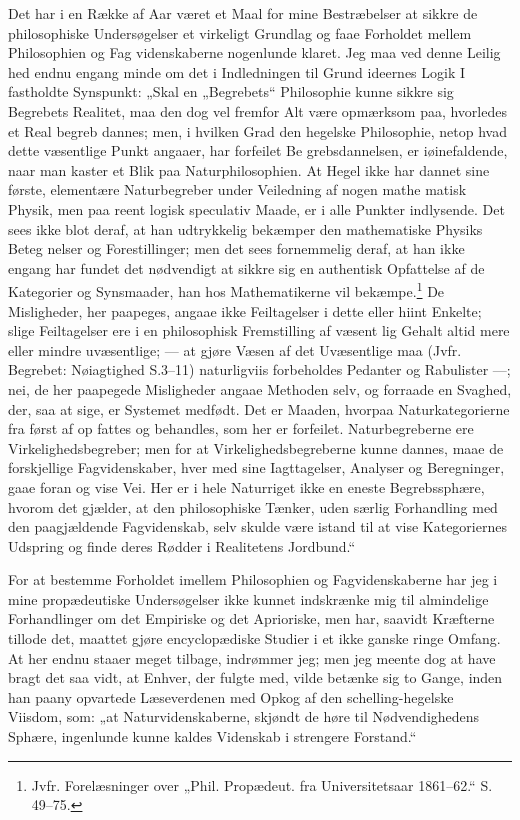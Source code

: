 \documentclass[12pt]{book}
\newcommand{\opage}[1]{\marginnote{\footnotesize\textit{[#1]}}}
\begin{document}
Det har i en Række af Aar været et Maal for mine
Bestræbelser at sikkre de philosophiske Undersøgelser et virkeligt
Grundlag og faae Forholdet mellem Philosophien og Fag\-%
videnskaberne nogenlunde klaret. Jeg maa ved denne Leilig\-%
hed endnu engang minde om det i Indledningen til Grund\-%
ideernes Logik I fastholdte Synspunkt: „Skal en „Begrebets“
Philosophie kunne sikkre sig Begrebets Realitet, maa den dog
vel fremfor Alt være opmærksom paa, hvorledes et Real\-%
begreb dannes; men, i hvilken Grad den hegelske Philosophie,
netop hvad dette væsentlige Punkt angaaer, har forfeilet Be\-%
grebsdannelsen, er iøinefaldende, naar man kaster et Blik
paa Naturphilosophien. At Hegel ikke har dannet sine første,
elementære Naturbegreber under Veiledning af nogen mathe\-%
matisk Physik, men paa reent logisk speculativ Maade, er
i alle Punkter indlysende. Det sees ikke blot deraf, at
han udtrykkelig bekæmper den mathematiske Physiks Beteg\-%
nelser og Forestillinger; men det sees fornemmelig deraf, at
han ikke engang har fundet det nødvendigt at sikkre sig en
authentisk Opfattelse af de Kategorier og Synsmaader, han
hos Mathematikerne vil bekæmpe.\footnote{Jvfr. Forelæsninger over „Phil. Propædeut. fra Universitetsaar
1861--62.“ S. 49--75.}
De Misligheder, her
paapeges, angaae ikke Feiltagelser i dette eller hiint Enkelte;
\opage{112}\setcounter{footnote}{0}%
slige Feiltagelser ere i en philosophisk Fremstilling af væsent\-%
lig Gehalt altid mere eller mindre uvæsentlige; --- at gjøre
Væsen af det Uvæsentlige maa (Jvfr. Begrebet: Nøiagtighed
S.3--11) naturligviis forbeholdes Pedanter og Rabulister ---;
nei, de her paapegede Misligheder angaae Methoden selv, og
forraade en Svaghed, der, saa at sige, er Systemet medfødt.
Det er Maaden, hvorpaa Naturkategorierne fra først af op\-%
fattes og behandles, som her er forfeilet. Naturbegreberne
ere Virkelighedsbegreber; men for at Virkelighedsbegreberne
kunne dannes, maae de forskjellige Fagvidenskaber, hver med sine
Iagttagelser, Analyser og Beregninger, gaae foran og vise
Vei. Her er i hele Naturriget ikke en eneste Begrebssphære,
hvorom det gjælder, at den philosophiske Tænker, uden særlig
Forhandling med den paagjældende Fagvidenskab, selv skulde
være istand til at vise Kategoriernes Udspring og finde deres
Rødder i Realitetens Jordbund.“

For at bestemme Forholdet imellem Philosophien og
Fagvidenskaberne har jeg i mine propædeutiske Undersøgelser
ikke kunnet indskrænke mig til almindelige Forhandlinger om
det Empiriske og det Aprioriske, men har, saavidt Kræfterne
tillode det, maattet gjøre encyclopædiske Studier i et ikke
ganske ringe Omfang. At her endnu staaer meget tilbage,
indrømmer jeg; men jeg meente dog at have bragt det saa\-%
vidt, at Enhver, der fulgte med, vilde betænke sig to Gange,
inden han paany opvartede Læseverdenen med Opkog af den
schelling-hegelske Viisdom, som: „at Naturvidenskaberne, skjøndt
de høre til Nødvendighedens Sphære, ingenlunde kunne kaldes
Videnskab i strengere Forstand.“
\end{document}

